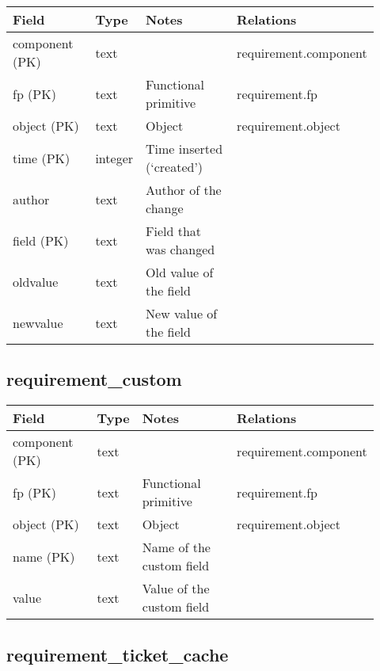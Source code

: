 \documentclass{article}
\begin{document}
{\footnotesize
\begin{centering}
\begin{tabular}{p{0.25\linewidth}p{0.07\linewidth}p{0.3\linewidth}p{0.3\linewidth}}
\textbf{Field} & \textbf{Type} & \textbf{Notes} & \textbf{Relations} \\
\hline
component (PK) & text & & requirement.component \\
\hline
fp (PK) & text & Functional primitive & requirement.fp \\
\hline
object (PK) & text & Object & requirement.object \\
\hline
time (PK) & integer & Time inserted (`created') & \\
\hline
author & text & Author of the change & \\
\hline
field (PK) & text & Field that was changed & \\
\hline
oldvalue & text & Old value of the field & \\
\hline
newvalue & text & New value of the field & \\
\hline
\end{tabular}
\end{centering}
}


\subsection{requirement\_custom}

{\footnotesize
\begin{centering}
\begin{tabular}{p{0.25\linewidth}p{0.07\linewidth}p{0.3\linewidth}p{0.3\linewidth}}
\textbf{Field} & \textbf{Type} & \textbf{Notes} & \textbf{Relations} \\
\hline
component (PK) & text & & requirement.component \\
\hline
fp (PK) & text & Functional primitive & requirement.fp \\
\hline
object (PK) & text & Object & requirement.object \\
\hline
name (PK) & text & Name of the custom field & \\
\hline
value & text & Value of the custom field & \\
\hline
\end{tabular}
\end{centering}
}


\subsection{requirement\_ticket\_cache}
\end{document}
